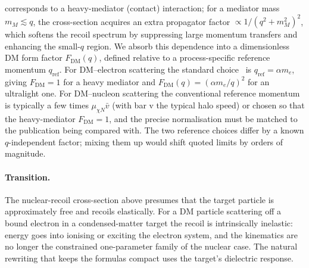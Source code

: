 \begin{remark}
 corresponds to a heavy-mediator (contact)
interaction; for a mediator mass $m_M\lesssim q$, the cross-section
acquires an extra propagator factor $\propto 1/(q^2+m_M^2)^2$, which
softens the recoil spectrum by suppressing large momentum transfers
and enhancing the small-$q$ region. We absorb this dependence into
a dimensionless DM form factor $F_\text{DM}(q)$, defined relative
to a process-specific reference momentum $q_\text{ref}$. For
DM--electron scattering the standard
choice~\cite{essig2012,knapen2021} is $q_\text{ref}=\alpha m_e$,
giving $F_\text{DM}=1$ for a heavy mediator and
$F_\text{DM}(q)=(\alpha m_e/q)^2$ for an ultralight one. For
DM--nucleon scattering the conventional reference momentum is
typically a few times $\mu_{\chi N}\bar v$ (with bar v the
typical halo speed) or chosen so that the heavy-mediator
$F_\text{DM}=1$, and the precise normalisation must be matched to
the publication being compared with. The two reference choices
differ by a known $q$-independent factor; mixing them up would
shift quoted limits by orders of magnitude.
\end{remark}

\paragraph{Transition.}
The nuclear-recoil cross-section above presumes that the target
particle is approximately free and recoils elastically. For a DM
particle scattering off a bound electron in a condensed-matter
target the recoil is intrinsically inelastic: energy goes into
ionising or exciting the electron system, and the kinematics are
no longer the constrained one-parameter family of the nuclear case.
The natural rewriting that keeps the formulas compact uses the
target's dielectric response.

